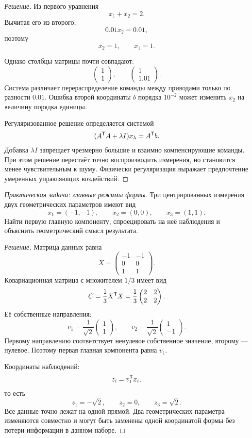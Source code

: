 \begin{proof}[Решение]
Из первого уравнения
\[
x_1+x_2=2.
\]
Вычитая его из второго,
\[
0.01x_2=0.01,
\]
поэтому
\[
x_2=1,
\qquad
x_1=1.
\]

Однако столбцы матрицы почти совпадают:
\[
\begin{pmatrix}1\\1\end{pmatrix},
\qquad
\begin{pmatrix}1\\1.01\end{pmatrix}.
\]
Система различает перераспределение команды между приводами только по разности \(0.01\). Ошибка второй координаты \(b\) порядка \(10^{-2}\) может изменить \(x_2\) на величину порядка единицы.

Регуляризованное решение определяется системой
\[
(A^{\mathsf{T}}A+\lambda I)x_\lambda
=
A^{\mathsf{T}}b.
\]
Добавка \(\lambda I\) запрещает чрезмерно большие и взаимно компенсирующие команды. При этом решение перестаёт точно воспроизводить измерения, но становится менее чувствительным к шуму. Физически регуляризация выражает предпочтение умеренных управляющих воздействий.
\end{proof}

\begin{problem}
\textit{Практическая задача: главные режимы формы.}
Три центрированных измерения двух геометрических параметров имеют вид
\[
x_1=(-1,-1),
\qquad
x_2=(0,0),
\qquad
x_3=(1,1).
\]
Найти первую главную компоненту, спроецировать на неё наблюдения и объяснить геометрический смысл результата.
\end{problem}

\begin{proof}[Решение]
Матрица данных равна
\[
X=
\begin{pmatrix}
-1&-1\\
0&0\\
1&1
\end{pmatrix}.
\]
Ковариационная матрица с множителем \(1/3\) имеет вид
\[
C
=
\frac13X^{\mathsf{T}}X
=
\frac13
\begin{pmatrix}
2&2\\
2&2
\end{pmatrix}.
\]
Её собственные направления:
\[
v_1
=
\frac1{\sqrt2}
\begin{pmatrix}
1\\1
\end{pmatrix},
\qquad
v_2
=
\frac1{\sqrt2}
\begin{pmatrix}
1\\-1
\end{pmatrix}.
\]
Первому направлению соответствует ненулевое собственное значение, второму --- нулевое. Поэтому первая главная компонента равна \(v_1\).

Координаты наблюдений:
\[
z_i=v_1^{\mathsf{T}}x_i,
\]
то есть
\[
z_1=-\sqrt2,
\qquad
z_2=0,
\qquad
z_3=\sqrt2.
\]
Все данные точно лежат на одной прямой. Два геометрических параметра изменяются совместно и могут быть заменены одной координатой формы без потери информации в данном наборе.
\end{proof}

